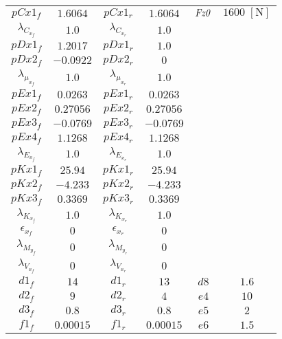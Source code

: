 \begin{longtable}{cccccc}
    \hline \hline
    \endlastfoot
$pCx1_f       $        &  $1.6064 $  &  $pCx1_r        $        &  $1.6064 $ & $\it Fz0$ & $1600 \; [\si{\newton}]$ \\
$\lambda_{C_{x_f}} $   &  $1.0    $  &  $\lambda_{C_{x_r}}  $   &  $1.0    $ & & \\
$pDx1_f       $        &  $1.2017 $  &  $pDx1_r        $        &  $1.0    $ & & \\
$pDx2_f       $        &  $-0.0922$  &  $pDx2_r        $        &  $0      $ & & \\
$\lambda_{\mu_{x_f}}$  &  $1.0    $  &  $\lambda_{\mu_{x_r}} $  &  $1.0    $ & & \\
$pEx1_f       $        &  $0.0263 $  &  $pEx1_r        $        &  $0.0263 $ & & \\
$pEx2_f       $        &  $0.27056$  &  $pEx2_r        $        &  $0.27056$ & & \\
$pEx3_f       $        &  $-0.0769$  &  $pEx3_r        $        &  $-0.0769$ & & \\
$pEx4_f       $        &  $1.1268 $  &  $pEx4_r        $        &  $1.1268 $ & & \\
$\lambda_{E_{x_f}} $   &  $1.0    $  &  $\lambda_{E_{x_r}}  $   &  $1.0    $ & & \\
$pKx1_f       $        &  $25.94  $  &  $pKx1_r        $        &  $25.94  $ & & \\
$pKx2_f       $        &  $-4.233 $  &  $pKx2_r        $        &  $-4.233 $ & & \\
$pKx3_f       $        &  $0.3369 $  &  $pKx3_r        $        &  $0.3369 $ & & \\
$\lambda_{K_{x_f}} $   &  $1.0    $  &  $\lambda_{K_{x_r}}  $   &  $1.0    $ & & \\
$\epsilon_{x_f}  $     &  $0      $  &  $\epsilon_{x_r}   $     &  $0      $ & & \\
$\lambda_{M_{y_f}} $   &  $0      $  &  $\lambda_{M_{y_r}}  $   &  $0      $ & & \\
$\lambda_{V_{x_f}} $   &  $0      $  &  $\lambda_{V_{x_r}}  $   &  $0      $ & & \\
$d1_f$ & $14     $   &  $d1_r$ & $13     $ &  $d8   $ & $1.6 $ \\    
$d2_f$ & $9      $   &  $d2_r$ & $4      $ &  $e4   $ & $10  $ \\    
$d3_f$ & $0.8    $   &  $d3_r$ & $0.8    $ &  $e5   $ & $2   $ \\    
$f1_f$ & $0.00015$   &  $f1_r$ & $0.00015$ &  $e6   $ & $1.5 $ \\    

\end{longtable}
